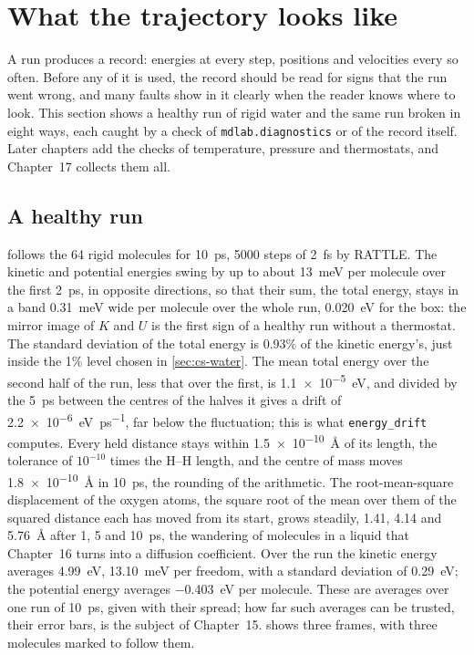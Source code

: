 \section{What the trajectory looks like}
\label{sec:cs-trajectory}

A run produces a record: energies at every step, positions and
velocities every so often. Before any of it is used, the record should be
read for signs that the run went wrong, and many faults show in it
clearly when the reader knows where to look. This section shows a
healthy run of rigid water and the same run broken in eight ways, each
caught by a check of \texttt{mdlab.diagnostics} or of the record itself. Later chapters add the
checks of temperature, pressure and thermostats, and Chapter~17 collects
them all.

\subsection*{A healthy run}

 follows the 64 rigid molecules for
\SI{10}{\pico\second}, 5000 steps of \SI{2}{\femto\second} by RATTLE. The
kinetic and potential energies swing by up to about
\SI{13}{\milli\electronvolt} per molecule over the first
\SI{2}{\pico\second}, in opposite directions, so that their sum, the total
energy, stays in a band \SI{0.31}{\milli\electronvolt} wide per molecule
over the whole run, \SI{0.020}{\electronvolt} for the box: the mirror image
of $K$ and $U$ is the first sign of a healthy run without a thermostat.
The standard deviation of the total energy is 0.93\% of the kinetic
energy's, just inside the 1\% level chosen in \cref{sec:cs-water}. The
mean total energy over the second half of the run, less that over the
first, is \SI{1.1e-5}{\electronvolt}, and divided by the
\SI{5}{\pico\second} between the centres of the halves it gives a drift of
\SI{2.2e-6}{\electronvolt\per\pico\second}, far below the fluctuation;
this is what \texttt{energy\_drift} computes. Every held distance stays
within \SI{1.5e-10}{\angstrom} of its length, the tolerance of $10^{-10}$
times the H--H length, and the centre of mass moves
\SI{1.8e-10}{\angstrom} in \SI{10}{\pico\second}, the rounding of the
arithmetic. The root-mean-square displacement of the oxygen atoms, the
square root of the mean over them of the squared distance each has moved
from its start, grows steadily, \num{1.41}, 4.14 and
\SI{5.76}{\angstrom} after 1, 5 and \SI{10}{\pico\second}, the wandering
of molecules in a liquid that Chapter~16 turns into a diffusion
coefficient. Over the run the kinetic energy averages
\SI{4.99}{\electronvolt}, \SI{13.10}{\milli\electronvolt} per freedom,
with a standard deviation of \SI{0.29}{\electronvolt}; the potential
energy averages \SI{-0.403}{\electronvolt} per molecule. These are
averages over one run of \SI{10}{\pico\second}, given with their spread;
how far such averages can be trusted, their error bars, is the subject of
Chapter~15.  shows three
frames, with three molecules marked to follow them.

